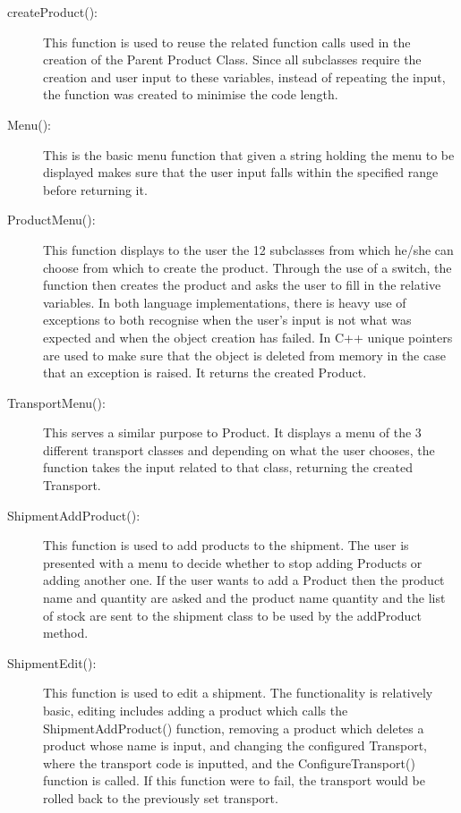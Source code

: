 \documentclass[12pt, a4paper]{report}
\begin{document}
\begin{description}
   \item [createProduct():] This function is used to reuse the related function calls used in the creation of the Parent Product Class. Since all subclasses require the creation and user input to these variables, instead of repeating the input, the function was created to minimise the code length. 
   
   \item [Menu():] This is the basic menu function that given a string holding the menu to be displayed makes sure that the user input falls within the specified range before returning it.  
   
   \item [ProductMenu():] This function displays to the user the 12 subclasses from which he/she can choose from which to create the product. Through the use of a switch, the function then creates the product and asks the user to fill in the relative variables. In both language implementations, there is heavy use of exceptions to both recognise when the user's input is not what was expected and when the object creation has failed. In C++ unique pointers are used to make sure that the object is deleted from memory in the case that an exception is raised. It returns the created Product.
   
   \item [TransportMenu():] This serves a similar purpose to Product. It displays a menu of the 3 different transport classes and depending on what the user chooses, the function takes the input related to that class, returning the created Transport.
   
   \item[ShipmentAddProduct():] This function is used to add products to the shipment. The user is presented with a menu to decide whether to stop adding Products or adding another one. If the user wants to add a Product then the product name and quantity are asked and the product name quantity and the list of stock are sent to the shipment class to be used by the addProduct method.
   
   \item[ShipmentEdit():] This function is used to edit a shipment. The functionality is relatively basic, editing includes adding a product which calls the ShipmentAddProduct() function, removing a product which deletes a product whose name is input, and changing the configured Transport, where the transport code is inputted, and the ConfigureTransport() function is called. If this function were to fail, the transport would be rolled back to the previously set transport.
\end{description}
\end{document}
